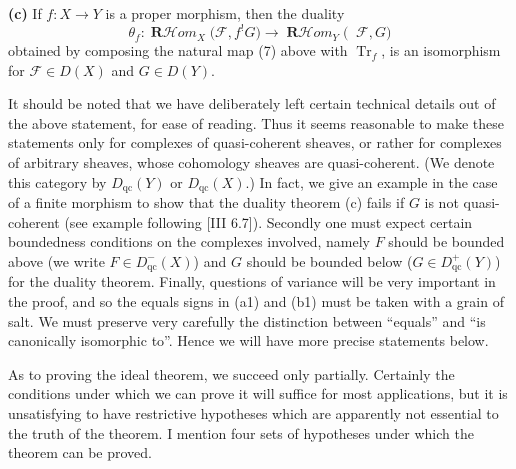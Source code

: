 \documentclass[12pt]{book}
\newcommand{\sheaf}[1]{\mathcal{#1}}
\DeclareMathOperator{\Rfst}{\mathbf{R}f_*}
\DeclareMathOperator{\RHom}{\mathbf{R}\mathcal{H}\textit{om}}
\begin{document}
\textbf{(c)} If \(f\colon X\to Y\) is a proper morphism, then the duality
\[
\theta_f\colon \RHom_X\bigl(\sheaf{F},f^! G\bigr)
\to \RHom_Y\bigl(\Rfst \sheaf{F},G\bigr)
\]
obtained by composing the natural map (7) above with \(\operatorname{Tr}_f\), is an isomorphism for \(\sheaf{F}\in D(X)\) and \(G\in D(Y)\).

\medskip
It should be noted that we have deliberately left certain technical details out of the above statement, for ease of reading. Thus it seems reasonable to make these statements only for complexes of quasi-coherent sheaves, or rather for complexes of arbitrary sheaves, whose cohomology sheaves are quasi-coherent. (We denote this category by \(D_{\mathrm{qc}}(Y)\) or \(D_{\mathrm{qc}}(X)\).) In fact, we give an example in the case of a finite morphism to show that the duality theorem (c) fails if \(G\) is not quasi-coherent (see example following [III 6.7]). Secondly one must expect certain boundedness conditions on the complexes involved, namely \(F\) should be bounded above (we write \(F\in D_{\mathrm{qc}}^-(X)\)) and \(G\) should be bounded below (\(G\in D_{\mathrm{qc}}^+(Y)\)) for the duality theorem. Finally, questions of variance will be very important in the proof, and so the equals signs in (a1) and (b1) must be taken with a grain of salt. We must preserve very carefully the distinction between ``equals'' and ``is canonically isomorphic to''. Hence we will have more precise statements below.

As to proving the ideal theorem, we succeed only partially. Certainly the conditions under which we can prove it will suffice for most applications, but it is unsatisfying to have restrictive hypotheses which are apparently not essential to the truth of the theorem. I mention four sets of hypotheses under which the theorem can be proved.
\end{document}

